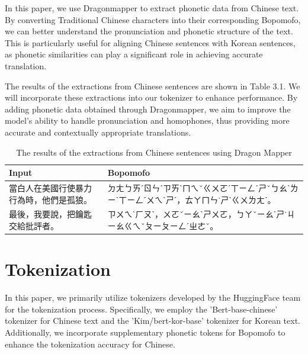 \documentclass[PhD]{PHlab-thesis}
\begin{document}
In this paper, we use Dragonmapper to extract phonetic data from Chinese text. By converting Traditional Chinese characters into their corresponding Bopomofo, we can better understand the pronunciation and phonetic structure of the text. This is particularly useful for aligning Chinese sentences with Korean sentences, as phonetic similarities can play a significant role in achieving accurate translation.

The results of the extractions from Chinese sentences are shown in Table 3.1. We will incorporate these extractions into our tokenizer to enhance performance. By adding phonetic data obtained through Dragonmapper, we aim to improve the model's ability to handle pronunciation and homophones, thus providing more accurate and contextually appropriate translations.


\begin{table}
\begin{tabularx}{0.9\linewidth}{p{7cm} p{7cm}}
Input & Bopomofo\\
\toprule
當白人在美國行使暴力行為時，他們是孤狼。 
& ㄉㄤㄅㄞˊㄖㄣˊㄗㄞˋㄇㄟˇㄍㄨㄛˊㄒㄧㄥˊㄕˇㄅㄠˋㄌㄧˋㄒㄧㄥˊㄨㄟˋㄕˊ，ㄊㄚㄇㄣ˙ㄕˋㄍㄨㄌㄤˊ。\\
\toprule
最後，我要說，把鑰匙交給批評者。 
&  ㄗㄨㄟˋㄏㄡˋ，ㄨㄛˇㄧㄠˋㄕㄨㄛ，ㄅㄚˇㄧㄠˋㄕ˙ㄐㄧㄠㄍㄟˇㄆㄧㄆㄧㄥˊㄓㄜˇ。\\
\bottomrule
\end{tabularx}
\caption{The results of the extractions from Chinese sentences using Dragon Mapper}
\label{tab:notation}
\end{table}
\section{Tokenization}
In this paper, we primarily utilize tokenizers developed by the HuggingFace team for the tokenization process. Specifically, we employ the 'Bert-base-chinese' tokenizer for Chinese text and the 'Kim/bert-kor-base' tokenizer for Korean text. Additionally, we incorporate supplementary phonetic tokens for Bopomofo to enhance the tokenization accuracy for Chinese.
\end{document}
